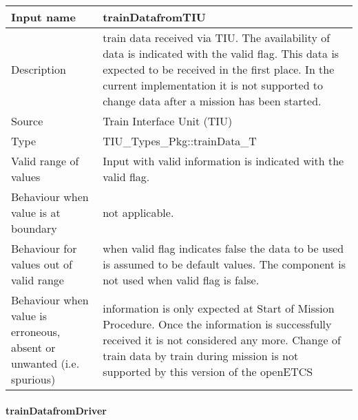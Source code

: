 \begin{longtable}{p{}p{}}
\toprule
Input name				& trainDatafromTIU \\
\midrule
Description				& train data received via TIU. The availability of data is indicated with the valid flag. This data is expected to be received in the first place. In the current implementation it is not supported to change data after a mission has been started.\\
\midrule
Source					& Train Interface Unit (TIU) \\ 
\midrule
Type					& TIU\_Types\_Pkg::trainData\_T \\
\midrule
Valid range of values	& Input with valid information is indicated with the valid flag. \\
\midrule
Behaviour when value is at boundary	& not applicable.\\
\midrule
Behaviour for values out of valid range	& when valid flag indicates false the data to be used is assumed to be default values. The component is not used when valid flag is false.\\
\midrule
Behaviour when value is erroneous, absent or unwanted (i.e. spurious) & information is only expected at Start of Mission Procedure. Once the information is successfully received it is not considered any more. Change of train data by train during mission is not supported by this version of the openETCS\\
\bottomrule
\end{longtable}

\paragraph{trainDatafromDriver}

